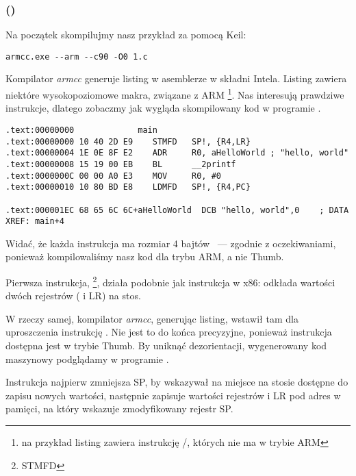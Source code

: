\subsubsection{\NonOptimizingKeilVI (\ARMMode)}

Na początek skompilujmy nasz przykład za pomocą Keil:

\begin{lstlisting}
armcc.exe --arm --c90 -O0 1.c 
\end{lstlisting}

\myindex{\IntelSyntax}
Kompilator \emph{armcc} generuje listing w asemblerze w składni Intela.
Listing zawiera niektóre wysokopoziomowe makra, związane z ARM
\footnote{na przykład listing zawiera instrukcję \PUSH/\POP, których nie ma w trybie ARM}.
Nas interesują prawdziwe instrukcje, dlatego zobaczmy jak wygląda skompilowany kod w programie \IDA.

\begin{lstlisting}[caption=\NonOptimizingKeilVI (\ARMMode) \IDA,style=customasmARM]
.text:00000000             main
.text:00000000 10 40 2D E9    STMFD   SP!, {R4,LR}
.text:00000004 1E 0E 8F E2    ADR     R0, aHelloWorld ; "hello, world"
.text:00000008 15 19 00 EB    BL      __2printf
.text:0000000C 00 00 A0 E3    MOV     R0, #0
.text:00000010 10 80 BD E8    LDMFD   SP!, {R4,PC}

.text:000001EC 68 65 6C 6C+aHelloWorld  DCB "hello, world",0    ; DATA XREF: main+4
\end{lstlisting}

Widać, że każda instrukcja ma rozmiar 4 bajtów ~--- zgodnie z oczekiwaniami, ponieważ kompilowaliśmy nasz kod dla trybu ARM, a nie Thumb.

Pierwsza instrukcja, \footnote{\ac{STMFD}},
działa podobnie jak instrukcja \PUSH w x86: odkłada wartości dwóch rejestrów ( i \ac{LR}) na stos.

W rzeczy samej, kompilator \emph{armcc}, generując listing, wstawił tam dla uproszczenia instrukcję .
Nie jest to do końca precyzyjne, ponieważ instrukcja \PUSH dostępna jest w trybie Thumb.
By uniknąć dezorientacji, wygenerowany kod maszynowy podglądamy w programie \IDA.

Instrukcja najpierw zmniejsza \ac{SP}, by wskazywał na miejsce na stosie dostępne do zapisu nowych wartości, następnie zapisuje wartości rejestrów  i \ac{LR}
pod adres w pamięci, na który wskazuje zmodyfikowany rejestr \ac{SP}.

